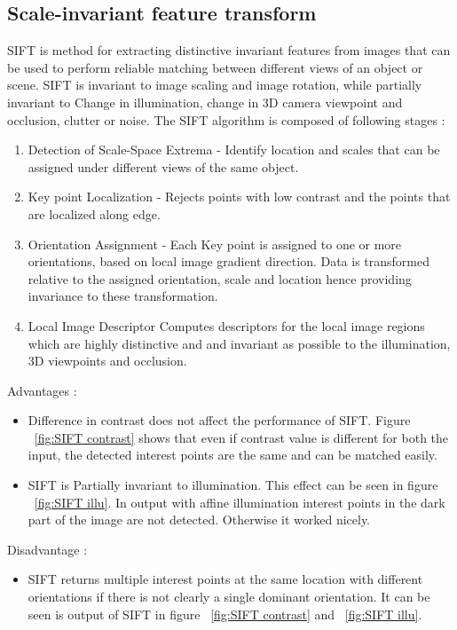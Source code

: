 \documentclass[11pt]{article}
\begin{document}
\subsection{Scale-invariant feature transform }
SIFT is method for extracting distinctive invariant features from images that can be used to perform reliable matching between different views of an object or scene. SIFT is invariant to image scaling and image rotation, while partially invariant to Change in illumination, change in 3D camera viewpoint and occlusion, clutter or noise.
The SIFT algorithm is composed of following stages \cite{Lowe:2004:DIF:993451.996342} :
\begin{enumerate}[itemsep=0em]


\item
Detection of Scale-Space Extrema - Identify location and scales that can be assigned under different views of the same object.
\item
Key point Localization - Rejects points with low contrast and the points that are localized along edge.
\item
Orientation Assignment - Each Key point is assigned to one or more orientations, based on local image gradient direction. Data is transformed relative to the assigned orientation, scale and location hence providing invariance to these transformation.
\item
Local Image Descriptor
Computes descriptors for the local image regions which are highly distinctive and  and invariant as possible to the illumination, 3D viewpoints and occlusion.
\end{enumerate}
Advantages :
\begin{itemize}[itemsep=0em]
\item
Difference in contrast does not affect the performance of SIFT. Figure ~\ref{fig:SIFT contrast} shows that even if contrast value is different for both the input, the detected interest points are the same and can be matched easily.
\item
SIFT is Partially invariant to illumination. This effect can be seen in figure ~\ref{fig:SIFT illu}. In output with affine illumination interest points in the dark part of the image are not detected. Otherwise it worked nicely.\\
\end{itemize}
Disadvantage :
\begin{itemize}[itemsep=0em]
\item

SIFT returns multiple interest points at the same location with different orientations if there is not clearly a single dominant orientation. It can be seen is output of SIFT in figure ~\ref{fig:SIFT contrast} and ~\ref{fig:SIFT illu}.
\end{itemize}
\end{document}
